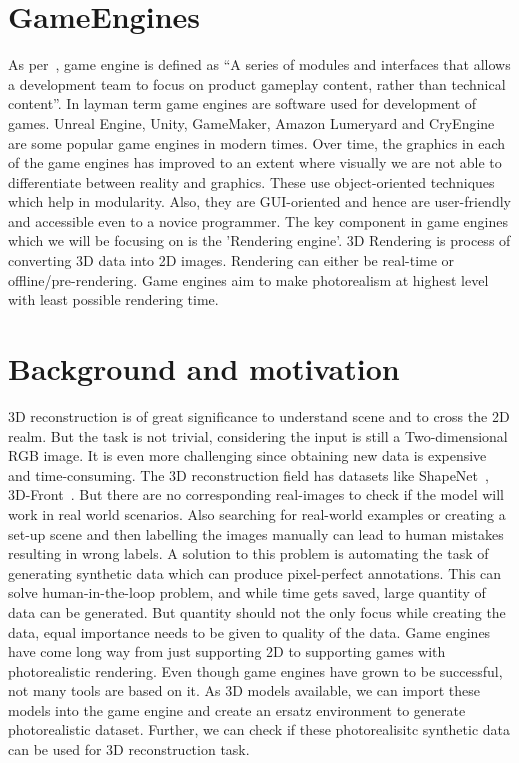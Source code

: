 \section{GameEngines}\label{sec:gameengines}
As per~\cite{10.5555/983334}, game engine is defined as “A series of modules and interfaces that allows a
development team to focus on product gameplay content, rather than technical content”.
In layman term game engines are software used for development of games.
Unreal Engine, Unity, GameMaker, Amazon Lumeryard and CryEngine are some popular game engines in modern times.
Over time, the graphics in each of the game engines has improved to an extent where visually we are not able to differentiate between reality and graphics.
These use object-oriented techniques which help in modularity.
Also, they are GUI-oriented and hence are user-friendly and accessible even to a novice programmer.
The key component in game engines which we will be focusing on is the 'Rendering engine'.
3D Rendering is process of converting 3D data into 2D images.
Rendering can either be real-time or offline/pre-rendering.
Game engines aim to make photorealism at highest level with least possible rendering time.


\section{Background and motivation}\label{sec:Background and motivation}
3D reconstruction is of great significance to understand scene and to cross the 2D realm.
But the task is not trivial, considering the input is still a Two-dimensional RGB image.
It is even more challenging since obtaining new data is expensive and time-consuming.
The 3D reconstruction field has datasets like ShapeNet~\cite{chang2015shapenet}, 3D-Front~\cite{Fu20203DFRONT3F}.
But there are no corresponding real-images to check if the model will work in real world scenarios.
Also searching for real-world examples or creating a set-up scene and then labelling the images manually can lead to human mistakes resulting in wrong labels.
A solution to this problem is automating the task of generating synthetic data which can produce pixel-perfect annotations.
This can solve human-in-the-loop problem, and while time gets saved, large quantity of data can be generated.
But quantity should not the only focus while creating the data, equal importance needs to be given to quality of the data.
Game engines have come long way from just supporting 2D to supporting games with photorealistic rendering.
Even though game engines have grown to be successful, not many tools are based on it.
As 3D models available, we can import these models into the game engine and create an ersatz environment to generate photorealistic dataset.
Further, we can check if these photorealisitc synthetic data can be used for 3D reconstruction task.

